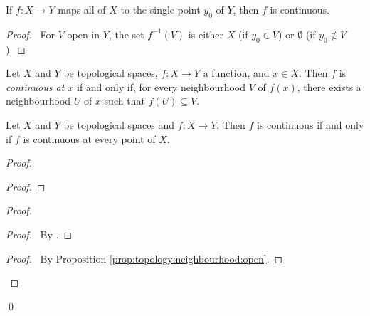 \begin{lm}
  \label{lm:topology:continuous:constant}
  If $f : X \rightarrow Y$ maps all of $X$ to the single point $y_0$ of $Y$,
  then $f$ is continuous.
\end{lm}

\begin{proof}
  \pf\ For $V$ open in $Y$, the set $f^{-1}(V)$ is either $X$ (if $y_0 \in
  V$) or $\emptyset$ (if $y_0 \notin V$).
\end{proof}

\begin{df}
  Let $X$ and $Y$ be topological spaces, $f : X \rightarrow Y$ a function,
  and
  $x \in X$. Then $f$ is \emph{continuous at $x$} if and only if, for every
  neighbourhood $V$ of $f(x)$, there exists a neighbourhood $U$ of $x$ such
  that
  $f(U) \subseteq V$.
\end{df}

\begin{thm}
  \label{thm:topology:continuous:at_every_point}
  Let $X$ and $Y$ be topological spaces and $f : X \rightarrow Y$. Then $f$
  is
  continuous if and only if $f$ is continuous at every point of $X$.
\end{thm}

\begin{proof}
  \pf
  \begin{proof}
  \end{proof}
  \begin{proof}
    \begin{proof}
      \pf\ By .
    \end{proof}
    \qedstep
    \begin{proof}
      \pf\ By Proposition \ref{prop:topology:neighbourhood:open}.
    \end{proof}
  \end{proof}
  \qed
\end{proof}


